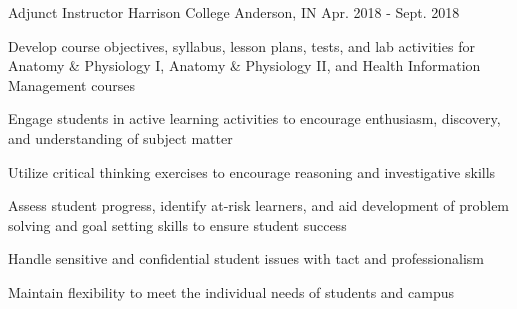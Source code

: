 \begin{cventries}
  \cventry
    {Adjunct Instructor}
    {Harrison College}
    {Anderson, IN}
    {Apr. 2018 - Sept. 2018}
    {
      \begin{cvitems}
      \item {Develop course objectives, syllabus, lesson plans, tests, and lab activities for Anatomy \& Physiology I, Anatomy \& Physiology II, and Health Information Management courses} 
        \item {Engage students in active learning activities to encourage enthusiasm, discovery, and understanding of subject matter}
        \item {Utilize critical thinking exercises to encourage reasoning and investigative skills}
        \item {Assess student progress, identify at-risk learners, and aid development of problem solving and goal setting skills to ensure student success}
        \item {Handle sensitive and confidential student issues with tact and professionalism}
        \item {Maintain flexibility to meet the individual needs of students and campus}
  \end{cvitems}
    }


\end{cventries}

